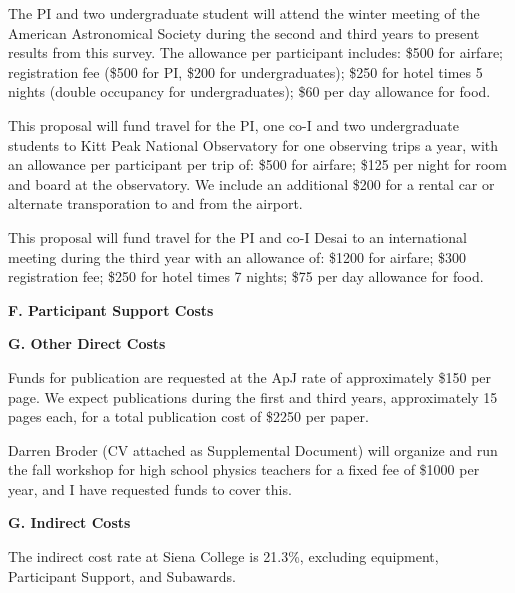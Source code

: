 \documentclass[preprint,11pt]{aastex}
\begin{document}
The PI and
two undergraduate student will attend 
the winter meeting of the American Astronomical
Society during the second and third years to present results from this survey.  
The allowance per participant 
includes: \$500 for airfare; registration fee (\$500 for PI, 
\$200 for undergraduates); \$250 for hotel times 5 nights
(double occupancy for undergraduates); \$60 per day allowance for food.  

This proposal will fund travel for the PI, one co-I and two undergraduate students 
to Kitt Peak National Observatory for one observing trips a year, with an allowance 
per participant per trip of: \$500 for airfare;
\$125 per night for room and board at the observatory.
We include an additional \$200 for a rental car or 
alternate transporation to and from the airport.

This proposal will fund travel for the PI and co-I Desai to an international 
meeting during the third year with an allowance of:
\$1200 for airfare; \$300 registration fee; \$250 for hotel times 7 nights;
\$75 per day allowance for food.

\begin{center}
{\bf \large F. Participant Support Costs}
\end{center}

\begin{center}
{\bf \large G. Other Direct Costs}
\end{center}



Funds for publication are requested at the ApJ rate of approximately \$150 per page.
We expect publications during the first and third years, approximately 15 pages
each, for a total publication cost of \$2250 per paper.



Darren Broder (CV attached as Supplemental 
Document) will organize and run the fall workshop for high school physics teachers
for a fixed fee of \$1000 per year, and I have requested funds to cover
this.




\begin{center}
{\bf \large G. Indirect Costs}
\end{center}

The indirect cost rate at Siena College is 21.3\%, excluding
equipment, Participant Support, and Subawards.  
\end{document}
